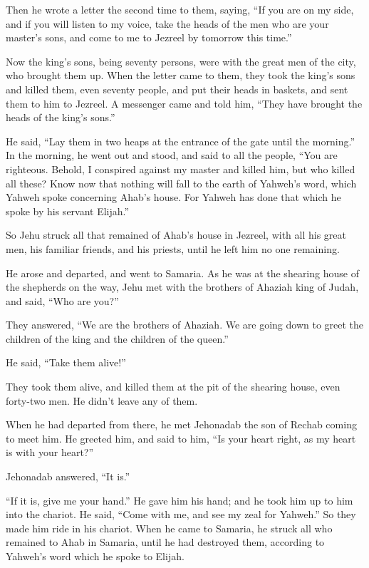  Then he wrote a letter the second time to them, saying,
``If you are on my side, and if you will listen to my voice, take the
heads of the men who are your master's sons, and come to me to Jezreel
by tomorrow this time.''

Now the king's sons, being seventy persons, were with the great men of
the city, who brought them up.  When the letter came to
them, they took the king's sons and killed them, even seventy people,
and put their heads in baskets, and sent them to him to Jezreel.
 A messenger came and told him, ``They have brought the
heads of the king's sons.''

He said, ``Lay them in two heaps at the entrance of the gate until the
morning.''  In the morning, he went out and stood, and said
to all the people, ``You are righteous. Behold, I conspired against my
master and killed him, but who killed all these?  Know now
that nothing will fall to the earth of Yahweh's word, which Yahweh spoke
concerning Ahab's house. For Yahweh has done that which he spoke by his
servant Elijah.''

 So Jehu struck all that remained of Ahab's house in
Jezreel, with all his great men, his familiar friends, and his priests,
until he left him no one remaining.

 He arose and departed, and went to Samaria. As he was at
the shearing house of the shepherds on the way,  Jehu met
with the brothers of Ahaziah king of Judah, and said, ``Who are you?''

They answered, ``We are the brothers of Ahaziah. We are going down to
greet the children of the king and the children of the queen.''

 He said, ``Take them alive!''

They took them alive, and killed them at the pit of the shearing house,
even forty-two men. He didn't leave any of them.

 When he had departed from there, he met Jehonadab the son
of Rechab coming to meet him. He greeted him, and said to him, ``Is your
heart right, as my heart is with your heart?''

Jehonadab answered, ``It is.''

``If it is, give me your hand.'' He gave him his hand; and he took him
up to him into the chariot.  He said, ``Come with me, and
see my zeal for Yahweh.'' So they made him ride in his chariot.
 When he came to Samaria, he struck all who remained to
Ahab in Samaria, until he had destroyed them, according to Yahweh's word
which he spoke to Elijah.

